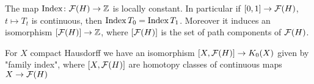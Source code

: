 \begin{theorem}\label{thm: index_is_homotopy_invariant}
 The map $\mathrm{Index}\colon\mathcal{F}(H)\to\mathbb{Z}$ is locally constant. In particular if $[0,1]\to\mathcal{F}(H)$, $t\mapsto T_t$ is continuous, then $\mathrm{Index} \,T_0=\mathrm{Index}\, T_1$. Moreover it induces an isomorphism $[\mathcal{F}(H)]\to\mathbb{Z}$, where $[\mathcal{F}(H)]$ is the set of path components of $\mathcal{F}(H)$.
\end{theorem}

\begin{theorem} 
 For $X$ compact Hausdorff we have an isomorphism $[X,\mathcal{F}(H)]\to K_0(X)$ given by "family index", where $[X,\mathcal{F}(H)]$ are homotopy classes of continuous maps $X\to\mathcal{F}(H)$
\end{theorem}
